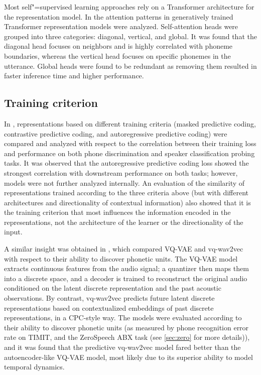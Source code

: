 Most self"=supervised learning approaches rely on a Transformer architecture for
the representation model. In \parencite{yang_understanding_2020} the attention patterns in
generatively trained Transformer representation models were analyzed.
Self-attention heads were grouped into three categories: diagonal, vertical,
and global. It was found that the diagonal head focuses on neighbors and is
highly correlated with phoneme boundaries, whereas the vertical head focuses on
specific phonemes in the utterance. Global heads were found to be redundant as
removing them resulted in faster inference time and higher performance.

\subsection{Training criterion}
In \parencite{chung_similarity_2021}, representations based on different training criteria
(masked predictive coding, contrastive predictive coding, and autoregressive
predictive coding) were compared  and analyzed with respect to the correlation
between their training loss and performance on both phone discrimination and
speaker classification probing tasks. It was observed that the autoregressive
predictive coding loss showed the strongest correlation with downstream
performance on both tasks; however, models were not further analyzed
internally. An evaluation of the similarity of representations trained
according to the three criteria above (but with different architectures and
directionality of contextual information) also showed that it is the training
criterion that most influences the information encoded in the representations,
not the architecture of the learner or the directionality of the input. 

A similar insight was obtained in \parencite{zhou_comparison_2021}, which compared VQ-VAE and
vq-wav2vec with respect to their ability to discover phonetic units.
The VQ-VAE model extracts continuous features from the audio signal; a
quantizer then  maps them into a discrete space, and a decoder is trained to
reconstruct the original audio conditioned on the latent discrete
representation and the past acoustic observations. By contrast, vq-wav2vec
predicts future latent discrete representations based on contextualized
embeddings of past discrete representations, in a CPC-style way. The models
were evaluated according to their ability to discover phonetic units (as
measured by phone recognition error rate on TIMIT, and the ZeroSpeech ABX task
(see \cref{sec:zero} for more details)), and it was found that the predictive vq-wav2vec
model fared better than the autoencoder-like VQ-VAE model, most likely due to
its superior ability to model temporal dynamics.

